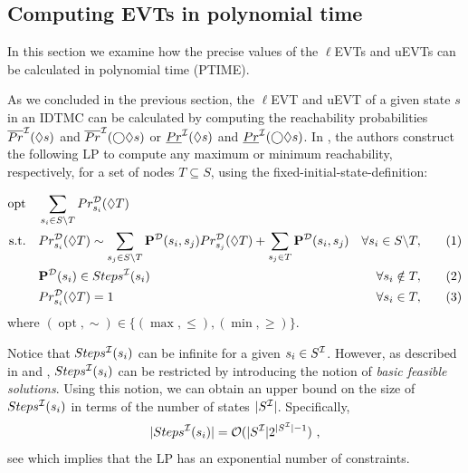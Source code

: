 \subsection{Computing EVTs in polynomial time}\label{sec:UMC_semantic}
In this section we examine how the precise values of the $\ell$EVTs and uEVTs can be calculated in polynomial time (PTIME).

As we concluded in the previous section, the $\ell$EVT and uEVT of a given state $s$ in an IDTMC can be calculated by computing the reachability probabilities $\overline{Pr}^{\mathcal{I}}(\lozenge s)$ and $\overline{Pr}^{\mathcal{I}}(\bigcirc \lozenge s)$ or $\underline{Pr}^{\mathcal{I}}(\lozenge s)$ and $\underline{Pr}^{\mathcal{I}}(\bigcirc \lozenge s)$. 
In \cite{complexity_model_checking_interval-valued_DTMCs}, the authors construct the following LP to compute any maximum or minimum reachability, respectively, for a set of nodes $T\subseteq S$, using the fixed-initial-state-definition:

\[
   \begin{aligned}
        \operatorname{opt} \quad & \sum_{s_i\in S\backslash T}Pr^{\mathcal{D}}_{s_i}(\lozenge T) & &\\
        \text{s.t.} \quad & Pr^{\mathcal{D}}_{s_i}(\lozenge T) \sim \sum_{s_j\in S\backslash T} \mathbf{P}^{\mathcal{D}}({s_i},s_j)Pr^{\mathcal{D}}_{s_j}(\lozenge T) + \sum_{s_j\in T}\mathbf{P}^{\mathcal{D}}(s_i,s_j) & \forall s_i \in S\backslash T, \qquad & (1)\\
        & \mathbf{P}^{\mathcal{D}}(s_i) \in Steps^{\mathcal{I}}(s_i) & \forall s_i\notin T, \qquad & (2)\\
        & Pr^{\mathcal{D}}_{s_i}(\lozenge T) = 1 & \forall s_i \in T, \qquad & (3)\\
    \end{aligned}
\]
where $(\operatorname{opt},\sim) \in \{(\max,\leq),(\min,\geq)\}$.

Notice that $Steps^{\mathcal{I}}(s_i)$ can be infinite for a given $s_i \in S^{\mathcal{I}}$. However, as described in \cite{complexity_model_checking_interval-valued_DTMCs} and \cite{Model-Checking_presence_Uncertainties}, $Steps^{\mathcal{I}}(s_i)$ can be restricted by introducing the notion of \textit{basic feasible solutions}. Using this notion, we can obtain an upper bound on the size of $Steps^{\mathcal{I}}(s_i)$ in terms of the number of states $|S^{\mathcal{I}}|$. Specifically, 
\[|Steps^{\mathcal{I}}(s_i)| = \mathcal{O}(|S^{\mathcal{I}}|2^{|S^{\mathcal{I}}|-1})\ ,\]
see \cite[Lemma 6]{Model-Checking_presence_Uncertainties} which implies that the LP has an exponential number of constraints.

